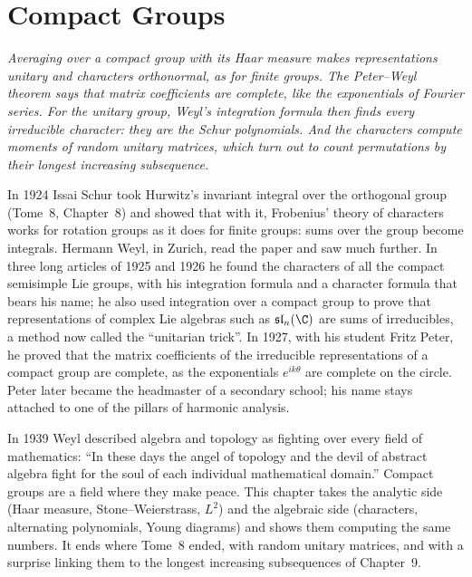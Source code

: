\chapter{Compact Groups}

\begin{center}\itshape
Averaging over a compact group with its Haar measure makes representations unitary and characters orthonormal, as for finite groups. The Peter--Weyl theorem says that matrix coefficients are complete, like the exponentials of Fourier series. For the
unitary group, Weyl's integration formula then finds every irreducible character: they are the Schur polynomials. And the characters compute moments of random unitary matrices, which turn out to count permutations by their longest increasing subsequence.
\end{center}

In 1924 Issai Schur took Hurwitz's invariant integral over the orthogonal group (Tome~8, Chapter~8) and showed that with it, Frobenius' theory of characters works for rotation groups as it does for finite groups: sums over the group become integrals.
Hermann Weyl, in Zurich, read the paper and saw much further. In three long articles of 1925 and 1926 he found the characters of all the compact semisimple Lie groups, with his integration formula and a character formula that bears his name; he also
used integration over a compact group to prove that representations of complex Lie algebras such as $\mathfrak{sl}_n(\C)$ are sums of irreducibles, a method now called the ``unitarian trick''. In 1927, with his student Fritz Peter, he proved
that the matrix coefficients of the irreducible representations of a compact group are complete, as the exponentials $e^{ik\theta}$ are complete on the circle. Peter later became the headmaster of a secondary school; his name stays attached to one of the
pillars of harmonic analysis.

In 1939 Weyl described algebra and topology as fighting over every field of mathematics: ``In these days the angel of topology and the devil of abstract algebra fight for the soul of each individual mathematical domain.'' Compact groups are a field where they
make peace. This chapter takes the analytic side (Haar measure, Stone--Weierstrass, $L^2$) and the algebraic side (characters, alternating polynomials, Young diagrams) and shows them computing the same numbers. It ends where Tome~8 ended, with random unitary
matrices, and with a surprise linking them to the longest increasing subsequences of Chapter~9.

